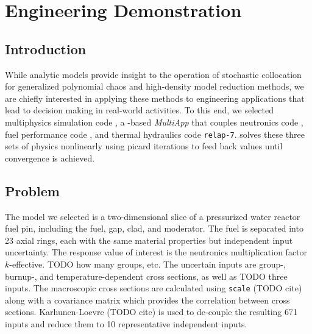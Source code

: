 
\chapter{Engineering Demonstration} %

\label{ch:mammoth} %



\section{Introduction}
While analytic models provide insight to the operation of stochastic collocation for generalized polynomial chaos and high-density
model reduction methods, we are chiefly interested in applying these methods to engineering applications that lead to
decision making in real-world activities.  To this end, we selected multiphysics simulation code \mammoth{}, a \moose{}-based
\emph{MultiApp} that couples neutronics code \rattlesnake{}, fuel performance code \bison{}, and thermal hydraulics code
\texttt{relap-7}.  \mammoth{} solves these three sets of physics nonlinearly using picard iterations to feed back values until
convergence is achieved.

\section{Problem}
The model we selected is a two-dimensional slice of a pressurized water reactor fuel pin, including the fuel, gap, clad, and
moderator.  The fuel is separated into 23 axial rings, each with the same material properties but independent input uncertainty.
The response value of interest is the neutronics multiplication factor $k$-effective.  TODO how many groups, etc.
The uncertain inputs are group-, burnup-, and temperature-dependent cross sections, as well as TODO three \bison{} inputs.
The macroscopic cross sections are calculated using \texttt{scale} (TODO cite) along with a covariance matrix which provides
the correlation between cross sections.  Karhunen-Loevre (TODO cite) is used to de-couple the resulting 671 inputs and
reduce them to 10 representative independent inputs.

